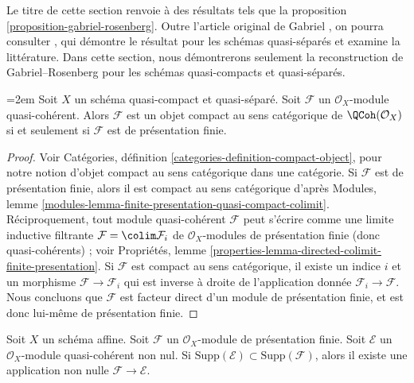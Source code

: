 \noindent
Le titre de cette section renvoie à des résultats tels que la
proposition \ref{proposition-gabriel-rosenberg}.
Outre l'article original de Gabriel \cite{Gabriel}, on pourra consulter
\cite{Brandenburg}, qui démontre le résultat pour les schémas quasi-séparés
et examine la littérature. Dans cette section, nous démontrerons seulement
la reconstruction de Gabriel--Rosenberg pour les schémas quasi-compacts et
quasi-séparés.

\begin{lemma}
\label{lemma-categorically-compact-QCoh}
\begingroup\emergencystretch=2em
Soit $X$ un schéma quasi-compact et quasi-séparé.
Soit $\mathcal{F}$ un $\mathcal{O}_X$-module quasi-cohérent.
Alors $\mathcal{F}$ est un objet compact au sens catégorique de
$\QCoh(\mathcal{O}_X)$ si et seulement si $\mathcal{F}$ est de
présentation finie.\par\endgroup
\end{lemma}

\begin{proof}
Voir Catégories, définition \ref{categories-definition-compact-object},
pour notre notion d'objet compact au sens catégorique dans une catégorie.
Si $\mathcal{F}$ est de présentation finie, alors il est compact au sens
catégorique d'après Modules, lemme
\ref{modules-lemma-finite-presentation-quasi-compact-colimit}.
Réciproquement, tout module quasi-cohérent $\mathcal{F}$ peut s'écrire
comme une limite inductive filtrante $\mathcal{F} = \colim \mathcal{F}_i$
de $\mathcal{O}_X$-modules de présentation finie (donc quasi-cohérents) ;
voir Propriétés, lemme
\ref{properties-lemma-directed-colimit-finite-presentation}.
Si $\mathcal{F}$ est compact au sens catégorique, il existe un indice $i$
et un morphisme $\mathcal{F} \to \mathcal{F}_i$ qui est inverse à droite de
l'application donnée $\mathcal{F}_i \to \mathcal{F}$.
Nous concluons que $\mathcal{F}$ est facteur direct d'un module de
présentation finie, et est donc lui-même de présentation finie.
\end{proof}

\begin{lemma}
\label{lemma-supported-on-support-pre}
Soit $X$ un schéma affine. Soit $\mathcal{F}$ un
$\mathcal{O}_X$-module de présentation finie. Soit $\mathcal{E}$ un
$\mathcal{O}_X$-module quasi-cohérent non nul. Si
$\text{Supp}(\mathcal{E}) \subset \text{Supp}(\mathcal{F})$,
alors il existe une application non nulle $\mathcal{F} \to \mathcal{E}$.
\end{lemma}

